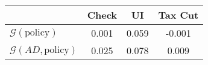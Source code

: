 \begin{tabular}{@{}lccc@{}}
\toprule
                          & Check      & UI    & Tax Cut    \\  \midrule
$\mathcal{G}(\text{policy})$ & 0.001  & 0.059  & -0.001     \\
$\mathcal{G}(AD,\text{policy})$ & 0.025  & 0.078  & 0.009     \\
\end{tabular}
